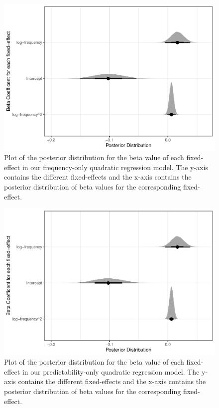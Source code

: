 \documentclass[
  man,floatsintext]{apa6}
\begin{document}
\begin{figure}

{\centering \includegraphics[width=0.8\linewidth]{write-up_files/figure-latex/FreqOnlyBetaPlot-1} 

}

\caption{Plot of the posterior distribution for the beta value of each fixed-effect in our frequency-only quadratic regression model. The y-axis contains the different fixed-effects and the x-axis contains the posterior distribution of beta values for the corresponding fixed-effect.}\label{fig:FreqOnlyBetaPlot}
\end{figure}

\begin{figure}

{\centering \includegraphics[width=0.8\linewidth]{write-up_files/figure-latex/PredicOnlyBetaPlot-1} 

}

\caption{Plot of the posterior distribution for the beta value of each fixed-effect in our predictability-only quadratic regression model. The y-axis contains the different fixed-effects and the x-axis contains the posterior distribution of beta values for the corresponding fixed-effect.}\label{fig:PredicOnlyBetaPlot}
\end{figure}
\end{document}
